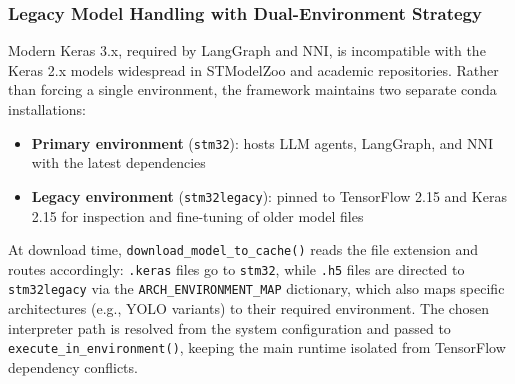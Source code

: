 \subsubsection{Legacy Model Handling with Dual-Environment Strategy}

Modern Keras 3.x, required by LangGraph and NNI, is incompatible with the Keras 2.x models widespread in STModelZoo and academic repositories. Rather than forcing a single environment, the framework maintains two separate conda installations:

\begin{itemize}
    \item \textbf{Primary environment} (\texttt{stm32}): hosts LLM agents, LangGraph, and NNI with the latest dependencies
    \item \textbf{Legacy environment} (\texttt{stm32legacy}): pinned to TensorFlow 2.15 and Keras 2.15 for inspection and fine-tuning of older model files
\end{itemize}

At download time, \texttt{download\_\allowbreak model\_\allowbreak to\_\allowbreak cache()} reads the file extension and routes accordingly: \texttt{.keras} files go to \texttt{stm32}, while \texttt{.h5} files are directed to \texttt{stm32legacy} via the \texttt{ARCH\_\allowbreak ENVIRONMENT\_\allowbreak MAP} dictionary, which also maps specific architectures (e.g., YOLO variants) to their required environment. The chosen interpreter path is resolved from the system configuration and passed to \texttt{execute\_\allowbreak in\_\allowbreak environment()}, keeping the main runtime isolated from TensorFlow dependency conflicts.
